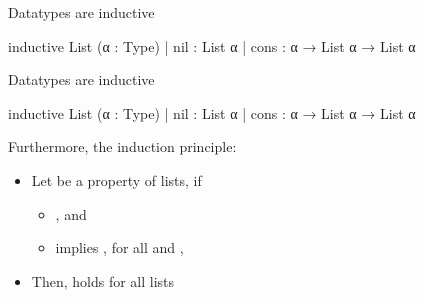 \documentclass[t,12pt]{beamer}
\begin{document}


\begin{frame}[fragile]{Datatypes are inductive}
    \bigskip
\begin{leancode}
inductive List (α : Type)
  | nil  : List α
  | cons : α → List α → List α
\end{leancode}

\bigskip


\end{frame}





\begin{frame}[fragile]{Datatypes are inductive}
    \bigskip
\begin{leancode}
inductive List (α : Type)
  | nil  : List α
  | cons : α → List α → List α
\end{leancode}

\bigskip
Furthermore, the induction principle:
\medskip

\begin{itemize}
    \item Let  be a property of lists, if
            \begin{itemize}
                \item {}, and
                \item {} implies , for all  and ,
            \end{itemize}
    \item Then,  holds for all lists
\end{itemize}

\end{frame}
\end{document}
